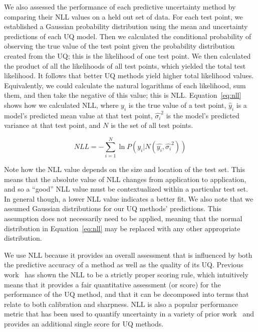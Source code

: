 \documentclass[]{achemso}
\begin{document}
We also assessed the performance of each predictive uncertainty method by comparing their \gls{NLL} values on a held out set of data.
For each test point, we established a Gaussian probability distribution using the mean and uncertainty predictions of each \gls{UQ} model.
Then we calculated the conditional probability of observing the true value of the test point given the probability distribution created from the \gls{UQ}; this is the likelihood of one test point.
We then calculated the product of all the likelihoods of all test points, which yielded the total test likelihood.
It follows that better \gls{UQ} methods yield higher total likelihood values.
Equivalently, we could calculate the natural logarithms of each likelihood, sum them, and then take the negative of this value; this is \gls{NLL}.
Equation~\ref{eq:nll} shows how we calculated \gls{NLL}, where $y_i$ is the true value of a test point, $\hat{y}_i$ is a model's predicted mean value at that test point, $\hat{\sigma_i}^2$ is the model's predicted variance at that test point, and $N$ is the set of all test points.

\begin{equation}\label{eq:nll}
    NLL = - \sum_{i=1}^{N} \ln{P(y_i | N(\hat{y_i}, \hat{\sigma_i}^2))}
\end{equation}

\noindent Note how the \gls{NLL} value depends on the size and location of the test set.
This means that the absolute value of \gls{NLL} changes from application to application, and so a ``good'' \gls{NLL} value must be contextualized within a particular test set.
In general though, a lower \gls{NLL} value indicates a better fit.
We also note that we assumed Gaussian distributions for our \gls{UQ} methods' predictions.
This assumption does not necessarily need to be applied, meaning that the normal distribution in Equation~\ref{eq:nll} may be replaced with any other appropriate distribution.

We use \gls{NLL} because it provides an overall assessment that is influenced
by both the predictive accuracy of a method as well as the quality of its
\gls{UQ}.  Previous work~\cite{gneiting2007strictly, Dawid2014} has shown the
\gls{NLL} to be a strictly proper scoring rule, which intuitively means that it
provides a fair quantitative assessment (or score) for the performance of the
\gls{UQ} method, and that it can be decomposed into terms that relate to both
calibration and sharpness.  \gls{NLL} is also a popular performance metric that
has been used to quantify uncertainty in a variety of prior
work~\cite{Lakshminarayanan2017} and provides an additional single score for
\gls{UQ} methods.
\end{document}
